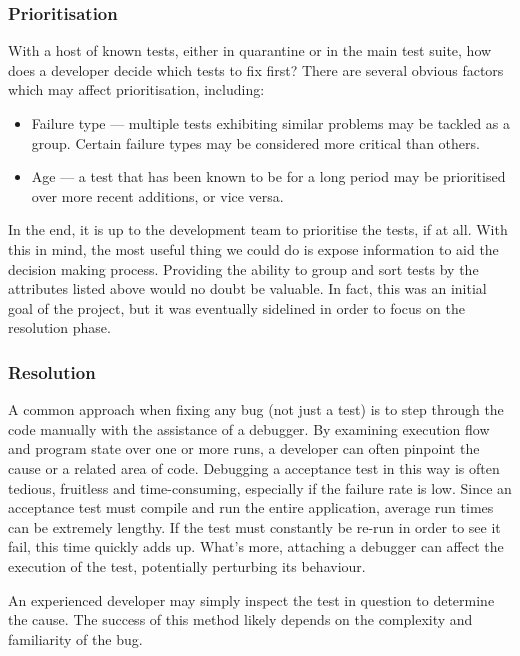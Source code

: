 \subsubsection{Prioritisation}

With a host of known \flaky tests, either in quarantine or in the main test
suite, how does a developer decide which tests to fix first? There are several
obvious factors which may affect prioritisation, including:
\begin{itemize}
	\item Failure type --- multiple \flaky tests exhibiting similar problems may
	be tackled as a group. Certain failure types may be considered more critical
	than others.
	\item Age --- a \flaky test that has been known to be \flaky for a long period
	may be prioritised over more recent additions, or vice versa.
\end{itemize}

In the end, it is up to the development team to prioritise the \flaky tests, if
at all. With this in mind, the most useful thing we could do is expose
information to aid the decision making process. Providing the ability to group
and sort \flaky tests by the attributes listed above would no doubt be valuable.
In fact, this was an initial goal of the project, but it was eventually
sidelined in order to focus on the resolution phase.

\subsubsection{Resolution}

A common approach when fixing any bug (not just a \flaky test) is to step
through the code manually with the assistance of a debugger. By examining
execution flow and program state over one or more runs, a developer can often
pinpoint the cause or a related area of code. Debugging a \flaky acceptance test
in this way is often tedious, fruitless and time-consuming, especially if the
failure rate is low. Since an acceptance test must compile and run the entire
application, average run times can be extremely lengthy. If the test must
constantly be re-run in order to see it fail, this time quickly adds up. What's
more, attaching a debugger can affect the execution of the test, potentially
perturbing its behaviour.

An experienced developer may simply inspect the test in question to determine
the cause. The success of this method likely depends on the complexity and
familiarity of the bug.

